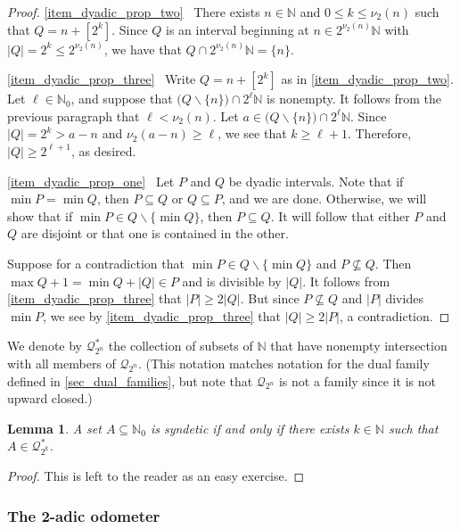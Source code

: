 \documentclass[letter,11pt]{article}
\theoremstyle{plain}
\newtheorem{lemma}[theorem]{Lemma}
\theoremstyle{definition}
\theoremstyle{plain}
\theoremstyle{plain}
\numberwithin{equation}{section}
\newcommand{\N}{\mathbb{N}}
\renewcommand{\leq}{\leqslant}
\renewcommand{\geq}{\geqslant}
\renewcommand{\setminus}{\backslash}
\newcommand{\cubes}{\mathcal{Q}}
\begin{document}
\begin{proof}
    
    \eqref{item_dyadic_prop_two} \ There exists $n \in \N$ and $0 \leq k \leq \nu_2(n)$ such that $Q = n + [2^k]$.  Since $Q$ is an interval beginning at $n \in 2^{\nu_2(n)} \N$ with $|Q| = 2^k \leq 2^{\nu_2(n)}$, we have that $Q \cap 2^{\nu_2(n)}\N = \{n\}$.

    \eqref{item_dyadic_prop_three} \ Write $Q = n + [2^k]$ as in \eqref{item_dyadic_prop_two}. Let $\ell \in \N_0$, and suppose that $\big(Q \setminus \{n\} \big) \cap 2^{\ell} \N$ is nonempty.  It follows from the previous paragraph that $\ell < \nu_2(n)$.  Let $a \in \big(Q \setminus \{n\} \big) \cap 2^{\ell} \N$.  Since $|Q| = 2^k > a-n$ and $\nu_2(a-n) \geq \ell$, we see that $k \geq \ell + 1$.  Therefore, $|Q| \geq 2^{\ell + 1}$, as desired.

    \eqref{item_dyadic_prop_one} \ Let $P$ and $Q$ be dyadic intervals.  Note that if $\min P = \min Q$, then $P \subseteq Q$ or $Q \subseteq P$, and we are done.  Otherwise, we will show that if $\min P \in Q \setminus \{\min Q\}$, then $P \subseteq Q$.  It will follow that either $P$ and $Q$ are disjoint or that one is contained in the other.  
    
    Suppose for a contradiction that $\min P \in Q \setminus \{\min Q\}$ and $P \not\subseteq Q$.  Then $\max Q + 1 = \min Q + |Q| \in P$ and is divisible by $|Q|$.  It follows from \eqref{item_dyadic_prop_three} that $|P| \geq 2 |Q|$.  But since $P \not\subseteq Q$ and $|P|$ divides $\min P$, we see by \eqref{item_dyadic_prop_three} that $|Q| \geq 2 |P|$, a contradiction.
\end{proof}

We denote by $\cubes_{2^n}^*$ the collection of subsets of $\N$ that have nonempty intersection with all members of $\cubes_{2^n}$.  (This notation matches notation for the dual family defined in \cref{sec_dual_families}, but note that $\cubes_{2^n}$ is not a family since it is not upward closed.)


\begin{lemma}
\label{lemma_syndetic_characterization}
A set $A \subseteq \N_0$ is syndetic if and only if there exists $k \in \N$ such that $A \in \cubes_{2^k}^*$.
\end{lemma}

\begin{proof}
    This is left to the reader as an easy exercise.
\end{proof}

\subsubsection{The 2-adic odometer}
\label{sec_two_adic_odometer}
\end{document}

